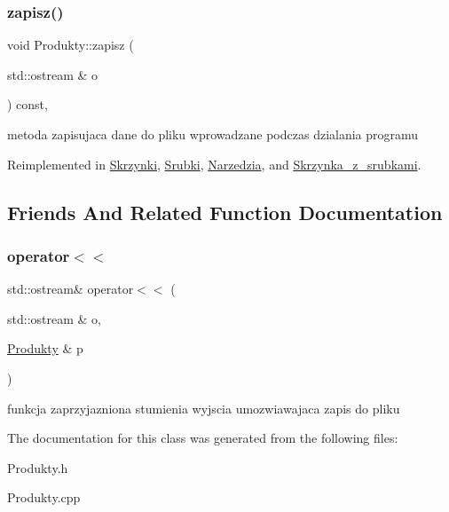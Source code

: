 \subsubsection{\texorpdfstring{zapisz()}{zapisz()}}
{\footnotesize\ttfamily void Produkty\+::zapisz (\begin{DoxyParamCaption}\item[{std\+::ostream \&}]{o }\end{DoxyParamCaption}) const\hspace{0.3cm}{\ttfamily [protected]}, {\ttfamily [virtual]}}

metoda zapisujaca dane do pliku wprowadzane podczas dzialania programu 

Reimplemented in \mbox{\hyperlink{class_skrzynki_a2980647e51a17161872064efc5f1b185}{Skrzynki}}, \mbox{\hyperlink{class_srubki_a2d8edbd9d8170f12378c750f634a7ecd}{Srubki}}, \mbox{\hyperlink{class_narzedzia_a4178a26508e00853e8c5c483f9a439a3}{Narzedzia}}, and \mbox{\hyperlink{class_skrzynka__z__srubkami_a62ccdf02cb9d364630ebea27ea94f2a3}{Skrzynka\+\_\+z\+\_\+srubkami}}.



\subsection{Friends And Related Function Documentation}
\mbox{\label{class_produkty_a222d7f697f1aa66b79aefe7163945973}} 
\subsubsection{\texorpdfstring{operator$<$$<$}{operator<<}}
{\footnotesize\ttfamily std\+::ostream\& operator$<$$<$ (\begin{DoxyParamCaption}\item[{std\+::ostream \&}]{o,  }\item[{\mbox{\hyperlink{class_produkty}{Produkty}} \&}]{p }\end{DoxyParamCaption})\hspace{0.3cm}{\ttfamily [friend]}}

funkcja zaprzyjazniona stumienia wyjscia umozwiawajaca zapis do pliku 

The documentation for this class was generated from the following files\+:\begin{DoxyCompactItemize}
\item 
Produkty.\+h\item 
Produkty.\+cpp\end{DoxyCompactItemize}

